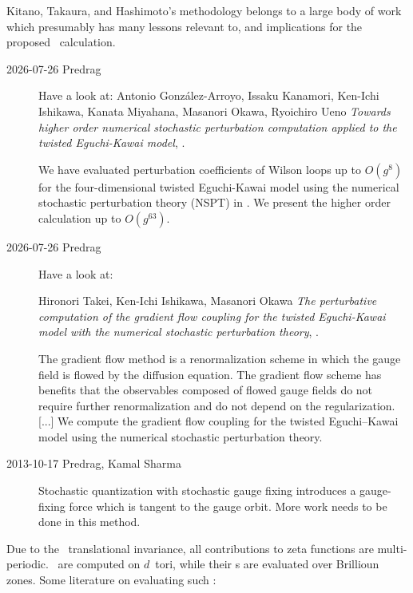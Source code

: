 Kitano, Takaura, and Hashimoto's  methodology belongs to a large body of work which presumably has many
lessons relevant to, and implications for the proposed \dft\ calculation.

\begin{description}
\item[2026-07-26 Predrag] Have a look at:
Antonio González-Arroyo, Issaku Kanamori, Ken-Ichi Ishikawa, Kanata Miyahana, Masanori Okawa, Ryoichiro Ueno
\emph{Towards higher order numerical stochastic perturbation computation applied to the twisted Eguchi-Kawai model},
.

We have evaluated perturbation coefficients of Wilson loops up to $O(g^8)$ for the four-dimensional twisted Eguchi-Kawai model 
using the numerical stochastic perturbation theory (NSPT) in . 
We present the higher order calculation up to $O(g^{63})$.




\item[2026-07-26 Predrag] Have a look at:

Hironori Takei, Ken-Ichi Ishikawa, Masanori Okawa
\emph{The perturbative computation of the gradient flow coupling for the twisted Eguchi-Kawai model with the numerical stochastic perturbation theory},
.

The gradient flow method is a renormalization scheme in which the gauge field is flowed by the diffusion equation. 
The gradient flow scheme has benefits that the observables composed of flowed gauge fields do not require further renormalization and do not depend on the regularization. 
[...] We compute the gradient flow coupling for the twisted Eguchi--Kawai model using the numerical stochastic perturbation theory. 

\item[2013-10-17 Predrag, Kamal Sharma] 
Stochastic quantization with stochastic gauge fixing
introduces a gauge-fixing force which is tangent to the gauge orbit. More
work needs to be done in this method.


\end{description}

\bigskip

\noindent
Due to the \spt\ translational invariance, all contributions to zeta functions are multi-periodic.
\Lsts\ are computed on $d$\dmn\ tori, while their {\stabexp}s are evaluated over Brillioun zones.
Some literature on evaluating such \lsts:

